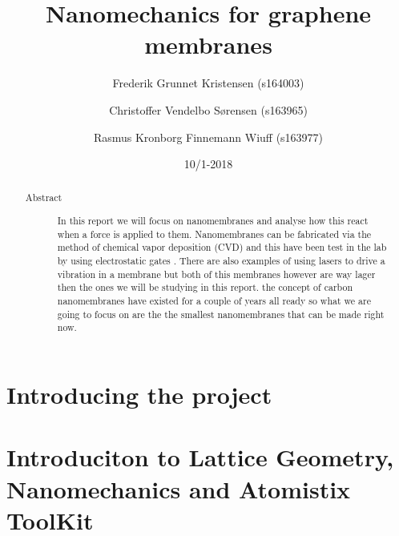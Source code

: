 \documentclass[aps, prb, a4paper, english, 12pt, twocolumn, longbibliography, amsmath, amssymb]{revtex4-1}
\begin{document}
\begin{abstract}
 \begin{description}
  \item[Abstract] In this report we will focus on nanomembranes and analyse how this react when a force is applied to them. Nanomembranes can be fabricated via the method of chemical vapor deposition (CVD) and this have been test in the lab by using electrostatic gates \cite{Zande2010}. There are also examples of using lasers to drive a vibration in a membrane \cite{Davidovikj2016} but both of this membranes however are way lager then the ones we will be studying in this report. the concept of carbon nanomembranes have existed for a couple of years all ready so what we are going to focus on are the the smallest nanomembranes that can be made right now.
 \end{description}
\end{abstract}

\title{Nanomechanics for graphene membranes}
\date{10/1-2018}
\author{Frederik Grunnet Kristensen (s164003)}
\author{Christoffer Vendelbo Sørensen (s163965)}
\author{Rasmus Kronborg Finnemann Wiuff (s163977)}

\maketitle


\tableofcontents

\makeatletter
\let\toc@pre\relax
\let\toc@post\relax
\makeatother

\thispagestyle{empty}
\newpage
\setcounter{page}{1}

\section{Introducing the project}

\section{Introduciton to Lattice Geometry, Nanomechanics and Atomistix ToolKit}




\end{document}
